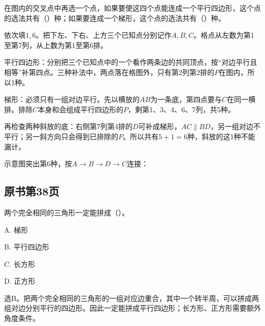 在图内的交叉点中再选一个点，如果要使这四个点能连成一个平行四边形，这个点的选法共有（\hspace{1.8em}）种；如果要连成一个梯形，这个点的选法共有（\hspace{1.8em}）种。\par
{}
\begin{BookAnswer}
依次填\(1,6\)。把下左、下右、上方三个已知点分别记作\(A,B,C\)。格点从左数为第1至第7列，从上数为第1至第6排。\par 平行四边形：分别把三个已知点中的一个看作两条边的共同顶点，按“对边平行且相等”补第四点。三种补法中，两点落在格图外，只有第2列第2排的\(P\)在图内，所以1种。\par 梯形：必须只有一组对边平行。先以横放的\(AB\)为一条底，第四点要与\(C\)在同一横排。排除\(C\)本身和会组成平行四边形的\(P\)，剩第1、3、4、6、7列，共5种。\par 再检查两种斜放的底：右侧第7列第4排的\(D\)可补成梯形，\allowbreak{}\(AC\parallel BD\)，另一组对边不平行；另一斜方向只会得到已排除的\(P\)。所以共有\(5+1=6\)种，斜放的这1种不能漏计。\par 示意图突出第6种，按\(A\to B\to D\to C\)连接：\par {}
\end{BookAnswer}



\subsection*{原书第38页}

两个完全相同的三角形一定能拼成（\hspace{1.8em}）。\par
\noindent A. 梯形\par
\noindent B. 平行四边形\par
\noindent C. 长方形\par
\noindent D. 正方形\par
\begin{BookAnswer}
选B。把两个完全相同的三角形的一组对应边重合，其中一个转半周，可以拼成两组对边分别平行的四边形。因此一定能拼成平行四边形；长方形、正方形需要额外角度条件。
\end{BookAnswer}

